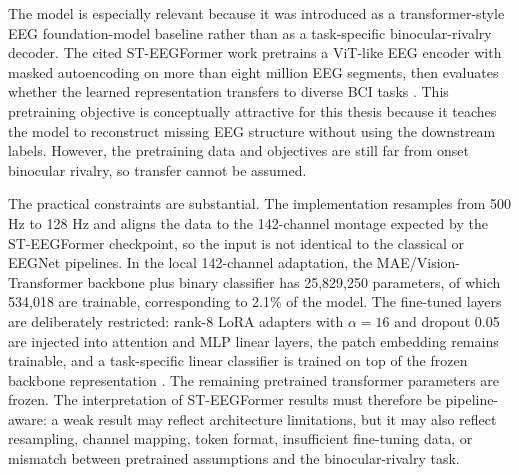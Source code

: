\documentclass[11pt,a4paper,chapterprefix=false,parskip=false]{scrreprt}
\begin{document}
The model is especially relevant because it was introduced as a transformer-style EEG foundation-model baseline rather than as a task-specific binocular-rivalry decoder. The cited ST-EEGFormer work pretrains a ViT-like EEG encoder with masked autoencoding on more than eight million EEG segments, then evaluates whether the learned representation transfers to diverse BCI tasks \citep{yang_are_2025}. This pretraining objective is conceptually attractive for this thesis because it teaches the model to reconstruct missing EEG structure without using the downstream labels. However, the pretraining data and objectives are still far from onset binocular rivalry, so transfer cannot be assumed.

The practical constraints are substantial. The implementation resamples from 500 Hz to 128 Hz and aligns the data to the 142-channel montage expected by the ST-EEGFormer checkpoint, so the input is not identical to the classical or EEGNet pipelines. In the local 142-channel adaptation, the MAE/Vision-Transformer backbone plus binary classifier has 25,829,250 parameters, of which 534,018 are trainable, corresponding to 2.1\% of the model. The fine-tuned layers are deliberately restricted: rank-8 LoRA adapters with $\alpha=16$ and dropout 0.05 are injected into attention and MLP linear layers, the patch embedding remains trainable, and a task-specific linear classifier is trained on top of the frozen backbone representation \citep{hu_lora_2022}. The remaining pretrained transformer parameters are frozen. The interpretation of ST-EEGFormer results must therefore be pipeline-aware: a weak result may reflect architecture limitations, but it may also reflect resampling, channel mapping, token format, insufficient fine-tuning data, or mismatch between pretrained assumptions and the binocular-rivalry task.
\end{document}
